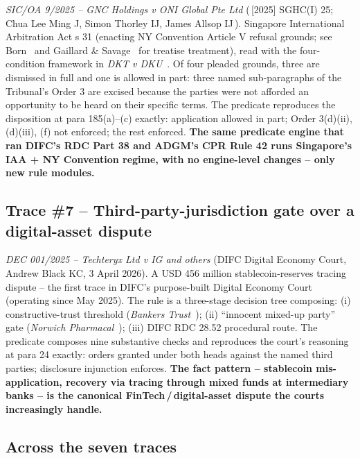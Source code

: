 \documentclass[11pt,letterpaper]{article}
\begin{document}
\textit{SIC/OA 9/2025 -- GNC Holdings v ONI Global Pte Ltd} (\,[2025] SGHC(I) 25; Chua Lee Ming J, Simon Thorley IJ, James Allsop IJ\,). Singapore International Arbitration Act s 31 (enacting NY Convention Article V refusal grounds; see Born~\cite{born} and Gaillard \& Savage~\cite{gaillard} for treatise treatment), read with the four-condition framework in \textit{DKT v DKU}~\cite{dktdku}. Of four pleaded grounds, three are dismissed in full and one is allowed in part: three named sub-paragraphs of the Tribunal's Order 3 are excised because the parties were not afforded an opportunity to be heard on their specific terms. The predicate reproduces the disposition at para 185(a)--(c) exactly: application allowed in part; Order 3(d)(ii), (d)(iii), (f) not enforced; the rest enforced. \textbf{The same predicate engine that ran DIFC's RDC Part 38 and ADGM's CPR Rule 42 runs Singapore's IAA + NY Convention regime, with no engine-level changes -- only new rule modules.}

\subsection{Trace \#7 -- Third-party-jurisdiction gate over a digital-asset dispute}

\textit{DEC 001/2025 -- Techteryx Ltd v IG and others} (DIFC Digital Economy Court, Andrew Black KC, 3 April 2026). A USD 456 million stablecoin-reserves tracing dispute -- the first trace in DIFC's purpose-built Digital Economy Court (operating since May 2025). The rule is a three-stage decision tree composing: (i) constructive-trust threshold (\textit{Bankers Trust}~\cite{bankerstrust}); (ii) ``innocent mixed-up party'' gate (\textit{Norwich Pharmacal}~\cite{norwich}); (iii) DIFC RDC 28.52 procedural route. The predicate composes nine substantive checks and reproduces the court's reasoning at para 24 exactly: orders granted under both heads against the named third parties; disclosure injunction enforces. \textbf{The fact pattern -- stablecoin mis-application, recovery via tracing through mixed funds at intermediary banks -- is the canonical FinTech\,/\,digital-asset dispute the courts increasingly handle.}

\subsection{Across the seven traces}
\end{document}
